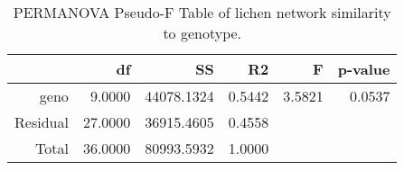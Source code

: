 \begin{table}[ht]
\centering
\begin{tabular}{rrrrrr}
  \hline
 & df & SS & R2 & F & p-value \\ 
  \hline
geno & 9.0000 & 44078.1324 & 0.5442 & 3.5821 & 0.0537 \\ 
  Residual & 27.0000 & 36915.4605 & 0.4558 &  &  \\ 
  Total & 36.0000 & 80993.5932 & 1.0000 &  &  \\ 
   \hline
\end{tabular}
\caption{PERMANOVA Pseudo-F Table of lichen network similarity to genotype.} 
\label{tab:cn_perm}
\end{table}
